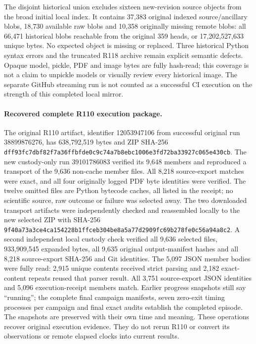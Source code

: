 The disjoint historical union excludes sixteen new-revision source objects
from the broad initial local index. It contains 37,383 original indexed
source/ancillary blobs, 18,730 available raw blobs and 10,358 originally
missing remote blobs: all 66,471 historical blobs reachable from the
original 359 heads, or 17,202,527,633 unique bytes. No expected object is
missing or replaced. Three historical Python syntax errors and the
truncated R118 archive remain explicit semantic defects. Opaque model,
pickle, PDF and image bytes are fully hash-read; this coverage is not a
claim to unpickle models or visually review every historical image.
The separate GitHub streaming run is not counted as a successful CI
execution on the strength of this completed local mirror.

\paragraph{Recovered complete R110 execution package.}
The original R110 artifact, identifier 12053947106 from successful original
run 38899876276, has 638,792,519 bytes and ZIP SHA-256
\nolinkurl{dff93fc7dbf82f7a36ffbfde0c9c74a7b8ebc1006e3fd72ba33927c065e430cb}.
The new custody-only run 39101786083 verified its 9,648 members and reproduced
a transport of the 9,636 non-cache member files. All 8,218 source-export
matches were exact, and all four originally logged PDF byte identities were
verified. The twelve omitted files are Python bytecode caches, all listed
in the receipt; no scientific source, raw outcome or failure was selected
away. The two downloaded transport artifacts were independently checked and
reassembled locally to the new selected ZIP with SHA-256
\nolinkurl{9f40a73a3ce4ca154228b1ffceb304be8a5a77d2909fc69b278fe0c56a94a8c2}.
A second independent local custody check verified all 9,636 selected files,
933,909,545 expanded bytes, all 9,635 original output-manifest hashes and
all 8,218 source-export SHA-256 and Git identities. The 5,097 JSON member
bodies were fully read: 2,915 unique contents received strict parsing and
2,182 exact-content repeats reused that parser result. All 3,751
source-export JSON identities and 5,096 execution-receipt members match.
Earlier progress snapshots still say ``running''; the complete final
campaign manifests, seven zero-exit timing processes per campaign and
final exact audits establish the completed episode. The snapshots are
preserved with their own time and meaning. These operations recover
original execution evidence. They do not rerun R110 or convert its
observations or remote elapsed clocks into current results.

